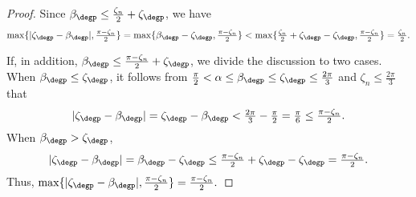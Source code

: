 \begin{proof}
    	Since $\beta_\degp \leq \tfrac{\zeta_n}{2} + \zeta_\degp$, we have
    	\[
    	\max\{|\zeta_\degp  - \beta_\degp |, \tfrac{\pi - \zeta_n}{2}\}
    	= \max\{\beta_\degp - \zeta_\degp, \tfrac{\pi - \zeta_n}{2}\}
    	< \max\{\tfrac{\zeta_n}{2}+\zeta_\degp - \zeta_\degp, \tfrac{\pi - \zeta_n}{2}\}
    	= \tfrac{\zeta_n}{2} .
    	\]
     
    	If, in addition, $\beta_\degp \leq \tfrac{\pi - \zeta_n}{2} + \zeta_\degp$, we divide the discussion to two cases.
    	When $\beta_\degp \leq \zeta_\degp$, it follows from $\tfrac{\pi}{2} < \alpha \leq \beta_\degp \leq \zeta_\degp  \leq \tfrac{2\pi}{3}$ and $\zeta_n \leq \tfrac{2\pi}{3}$ that
    	\[
    	|\zeta_\degp  - \beta_\degp |
    	= \zeta_\degp  - \beta_\degp
    	< \tfrac{2\pi}{3} - \tfrac{\pi}{2}
    	= \tfrac{\pi}{6}
    	\leq \tfrac{\pi - \zeta_n}{2}.
    	\]
    	When $\beta_\degp > \zeta_\degp$, 
    	\[
    	|\zeta_\degp  - \beta_\degp |
    	= \beta_\degp - \zeta_\degp
    	\leq \tfrac{\pi - \zeta_n}{2} + \zeta_\degp - \zeta_\degp
    	= \tfrac{\pi - \zeta_n}{2}.
    	\]
    	Thus, $\max\{|\zeta_\degp  - \beta_\degp |, \tfrac{\pi - \zeta_n}{2}\} = \tfrac{\pi - \zeta_n}{2}.$
\end{proof}



